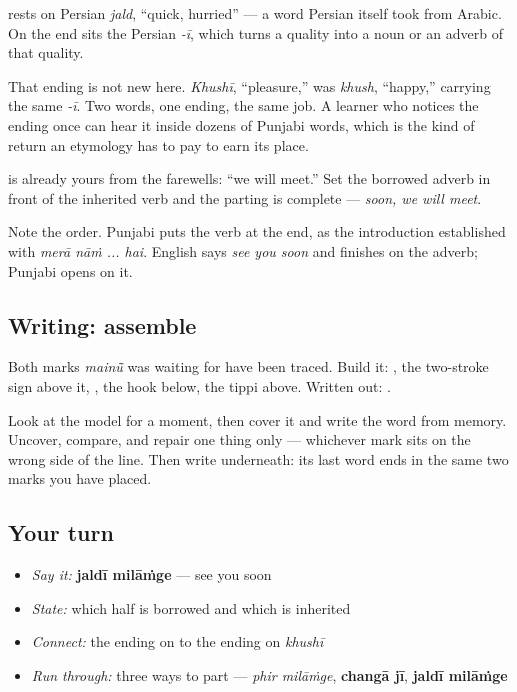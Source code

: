 \begin{cousinweb}
\textbf{} rests on Persian \emph{jald}, \textquotedblleft{}quick, hurried\textquotedblright{} — a word Persian itself took from Arabic. On the end sits the Persian \emph{-ī}, which turns a quality into a noun or an adverb of that quality.

That ending is not new here. \emph{Khushī}, \textquotedblleft{}pleasure,\textquotedblright{} was \emph{khush}, \textquotedblleft{}happy,\textquotedblright{} carrying the same \emph{-ī}. Two words, one ending, the same job. A learner who notices the ending once can hear it inside dozens of Punjabi words, which is the kind of return an etymology has to pay to earn its place.

\textbf{} is already yours from the farewells: \textquotedblleft{}we will meet.\textquotedblright{} Set the borrowed adverb in front of the inherited verb and the parting is complete — \emph{soon, we will meet}.

Note the order. Punjabi puts the verb at the end, as the introduction established with \emph{merā nāṁ ... hai}. English says \emph{see you soon} and finishes on the adverb; Punjabi opens on it.
\end{cousinweb}

\subsection*{Writing: assemble }
Both marks \emph{mainū̃} was waiting for have been traced. Build it: \textbf{}, the two-stroke sign above it, \textbf{}, the hook below, the tippi above. Written out: \textbf{}.

Look at the model for a moment, then cover it and write the word from memory. Uncover, compare, and repair one thing only — whichever mark sits on the wrong side of the line. Then write \textbf{  } underneath: its last word ends in the same two marks you have placed.

\subsection*{Your turn}
\begin{itemize}
\raggedright
  \item \emph{Say it:} \textbf{jaldī milāṁge} — see you soon
  \item \emph{State:} which half is borrowed and which is inherited
  \item \emph{Connect:} the ending on \textbf{} to the ending on \emph{khushī}
  \item \emph{Run through:} three ways to part — \emph{phir milāṁge}, \textbf{changā jī}, \textbf{jaldī milāṁge}
\end{itemize}

